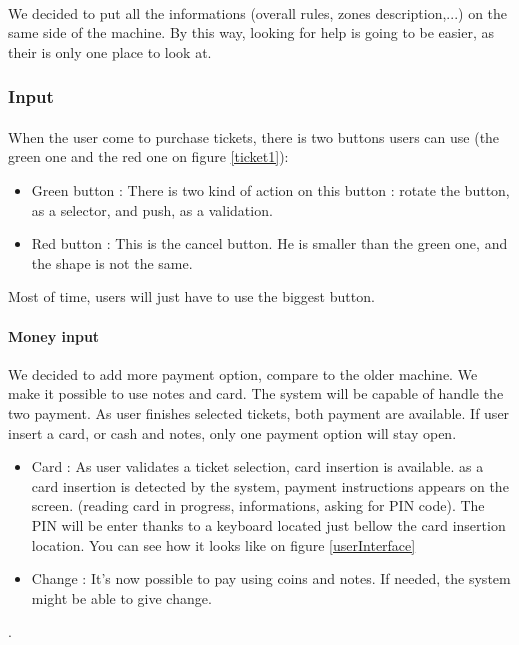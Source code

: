 \documentclass[a4paper,12pt]{article} %
\begin{document}
\paragraph{}We decided to put all the informations (overall rules, zones description,...) on the same side of the machine. By this way, looking for help is going to be easier, as their is only one place to look at. 

\subsubsection{Input}
\paragraph{}
When the user come to purchase tickets, there is two buttons users can use (the green one and the red one on figure \ref{ticket1}): 
\begin{itemize}
\item Green button : There is two kind of action on this button : rotate the button, as a selector, and push, as a validation.
\item Red button : This is the cancel button. He is smaller than the green one, and the shape is not the same.
\end{itemize}
Most of time, users will just have to use the biggest button.

\paragraph{Money input}
We decided to add more payment option, compare to the older machine. We make it possible to use notes and card. The system will be capable of handle the two payment. As user finishes selected tickets, both payment are available. If user insert a card, or cash and notes, only one payment option will stay open.
\begin{itemize}
\item Card : As user validates a ticket selection, card insertion is available. as a card insertion is detected by the system, payment instructions appears on the screen. (reading card in progress, informations, asking for PIN code). The PIN will be enter thanks to a keyboard located just bellow the card insertion location. You can see how it looks like on figure \ref{userInterface}
\item Change : It's now possible to pay using coins and notes. If needed, the system might be able to give change.
\end{itemize}.
\end{document}
